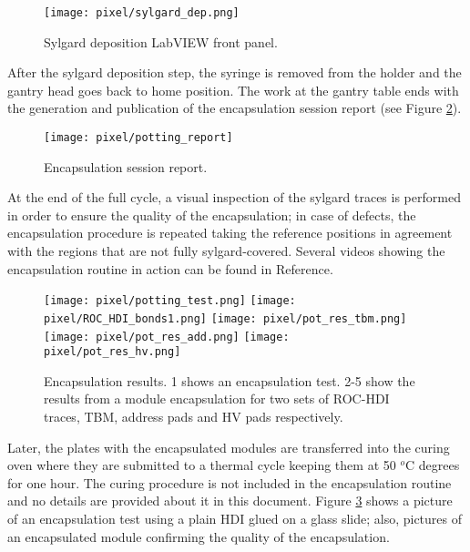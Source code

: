 \begin{figure}[h]
\begin{center}
  \texttt{[image: pixel/sylgard\_dep.png]}
  \caption{Sylgard deposition LabVIEW front panel.}\label{fig:sylgard_dep}
\end{center}
\end{figure}

After the sylgard deposition step, the syringe is removed from the holder and the gantry head goes back to home position. The work at the gantry table ends with the generation and publication of the encapsulation session report (see Figure \ref{fig:potting_report}).   

\begin{figure}[h]
\begin{center}
  \texttt{[image: pixel/potting\_report]}
 \caption[Encapsulation session report.]{Encapsulation session report.}\label{fig:potting_report}
\end{center}
\end{figure}

At the end of the full cycle, a visual inspection of the sylgard traces is performed in order to ensure the quality of the encapsulation; in case of defects, the encapsulation procedure is repeated taking the reference positions in agreement with the regions that are not fully sylgard-covered. Several videos showing the encapsulation routine in action can be found in Reference\cite{jmonroy_channel}.

\begin{figure}[h]
\begin{center}
  \texttt{[image: pixel/potting\_test.png]}
  \texttt{[image: pixel/ROC\_HDI\_bonds1.png]}
  \texttt{[image: pixel/pot\_res\_tbm.png]}
  \texttt{[image: pixel/pot\_res\_add.png]}
  \texttt{[image: pixel/pot\_res\_hv.png]}
  \caption[Encapsulation results.]{Encapsulation results. 1 shows an encapsulation test. 2-5 show the results from a module encapsulation for two sets of ROC-HDI traces, TBM, address pads and HV pads respectively.}\label{fig:potted_module}
\end{center}
\end{figure}

Later, the plates with the encapsulated modules are transferred into the curing oven where they are submitted to a thermal cycle keeping them at 50 $^o$C degrees for one hour. The curing procedure is not included in the encapsulation routine and no details are provided about it in this document. Figure \ref{fig:potted_module} shows a picture of an encapsulation test using a plain HDI glued on a glass slide; also, pictures of an encapsulated module confirming the quality of the encapsulation.  

